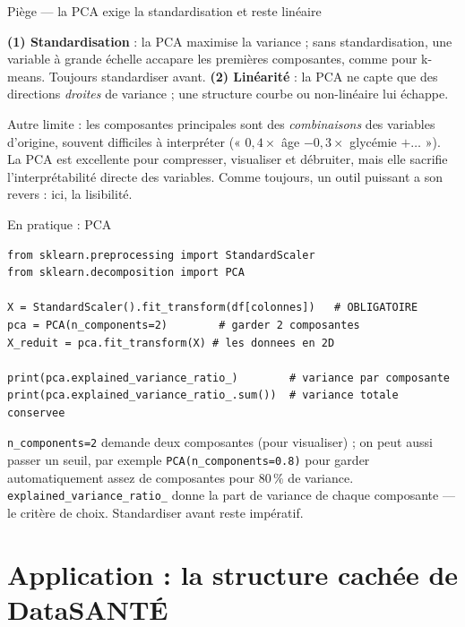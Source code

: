 \documentclass[aspectratio=169,11pt]{beamer}
\begin{document}
\begin{frame}{Piège — la PCA exige la standardisation et reste linéaire}
\begin{ucadpiege}
{\small \textbf{(1) Standardisation} : la PCA maximise la variance ; sans standardisation, une variable à grande échelle accapare les premières composantes, comme pour k-means. Toujours standardiser avant. \textbf{(2) Linéarité} : la PCA ne capte que des directions \emph{droites} de variance ; une structure courbe ou non-linéaire lui échappe.}
\end{ucadpiege}
{\small Autre limite : les composantes principales sont des \emph{combinaisons} des variables d'origine, souvent difficiles à interpréter (« $0{,}4 \times$ âge $- 0{,}3 \times$ glycémie $+ \dots$ »). La PCA est excellente pour compresser, visualiser et débruiter, mais elle sacrifie l'interprétabilité directe des variables. Comme toujours, un outil puissant a son revers : ici, la lisibilité.}
\end{frame}

\begin{frame}[fragile]{En pratique : PCA}
\begin{lstlisting}
from sklearn.preprocessing import StandardScaler
from sklearn.decomposition import PCA

X = StandardScaler().fit_transform(df[colonnes])   # OBLIGATOIRE
pca = PCA(n_components=2)        # garder 2 composantes
X_reduit = pca.fit_transform(X) # les donnees en 2D

print(pca.explained_variance_ratio_)        # variance par composante
print(pca.explained_variance_ratio_.sum())  # variance totale conservee
\end{lstlisting}
{\small \texttt{n\_components=2} demande deux composantes (pour visualiser) ; on peut aussi passer un seuil, par exemple \texttt{PCA(n\_components=0.8)} pour garder automatiquement assez de composantes pour $80\,\%$ de variance. \texttt{explained\_variance\_ratio\_} donne la part de variance de chaque composante — le critère de choix. Standardiser avant reste impératif.}
\end{frame}

\section{Application : la structure cachée de DataSANTÉ}
\end{document}
